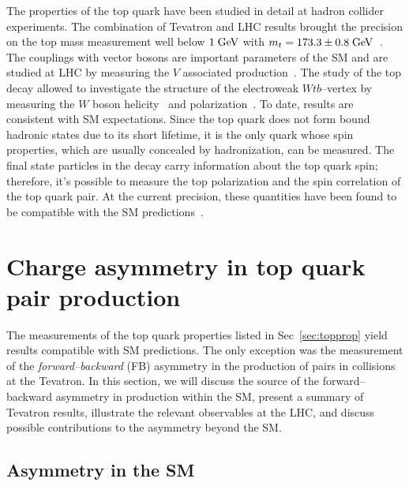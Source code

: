 The properties of the top quark have been studied in detail at hadron
collider experiments. The combination of Tevatron and LHC results
brought the precision on the top mass measurement well below $1 \; \mathrm{GeV}{}$
with $m_t=173.3\pm{}0.8 \; \mathrm{GeV}{}$~\cite{topmass}.
The couplings with vector bosons are important parameters of the SM
and are studied at LHC by measuring the \ttbar{}$V$ associated
production~\cite{CMS-PAS-TOP-13-011,ATLAS-CONF-2014-038}.
The study of the top decay allowed to investigate the structure of the
electroweak $Wtb$--vertex by measuring the $W$ boson
helicity~\cite{Khachatryan:2014vma} and
polarization~\cite{ATLAS-CONF-2013-033}. To date, results are
consistent with SM expectations.
Since the top quark does not form bound hadronic states due to its
short lifetime, it is the only quark whose spin properties, which are usually
concealed by hadronization, can be measured. The final state
particles in the decay carry information about the top quark spin;
therefore, it's possible to measure the top polarization and the spin
correlation of the top quark pair. At the current precision, these
quantities have been found to be compatible with the SM
predictions~\cite{Aad:2013ksa,Aad:2014pwa,Chatrchyan:2013wua}. 

\section{Charge asymmetry in top quark pair production}
\label{sec:topca}

The measurements of the top quark properties listed in
Sec~\ref{sec:topprop} yield results compatible with SM predictions.
The only exception was the measurement of the {\it forward--backward}
(FB) asymmetry in the production of \ttbar{} pairs in \ppbar{}
collisions at the Tevatron. In this section, we will discuss the
source of the forward--backward asymmetry in \ttbar{} production
within the SM, present a summary of Tevatron results, illustrate the
relevant observables at the LHC, and discuss possible contributions to
the asymmetry beyond the SM.

\subsection{Asymmetry in the SM}
\label{sec:smca}


